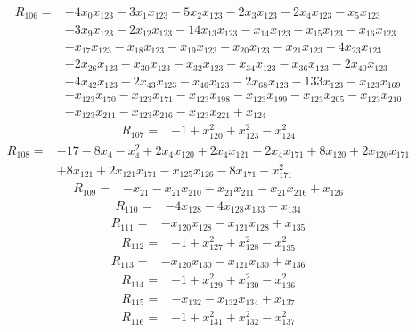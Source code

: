 \[\begin{aligned}R_{106}={}&-4x_{0}x_{123}-3x_{1}x_{123}-5x_{2}x_{123}-2x_{3}x_{123}-2x_{4}x_{123}-x_{5}x_{123}
\\&-3x_{9}x_{123}-2x_{12}x_{123}-14x_{13}x_{123}-x_{14}x_{123}-x_{15}x_{123}-x_{16}x_{123}
\\&-x_{17}x_{123}-x_{18}x_{123}-x_{19}x_{123}-x_{20}x_{123}-x_{21}x_{123}-4x_{23}x_{123}
\\&-2x_{26}x_{123}-x_{30}x_{123}-x_{32}x_{123}-x_{34}x_{123}-x_{36}x_{123}-2x_{40}x_{123}
\\&-4x_{42}x_{123}-2x_{43}x_{123}-x_{46}x_{123}-2x_{68}x_{123}-133x_{123}-x_{123}x_{169}
\\&-x_{123}x_{170}-x_{123}x_{171}-x_{123}x_{198}-x_{123}x_{199}-x_{123}x_{205}-x_{123}x_{210}
\\&-x_{123}x_{211}-x_{123}x_{216}-x_{123}x_{221}+x_{124}
\end{aligned}\]
\[\begin{aligned}R_{107}={}&-1+x_{120}^{2}+x_{123}^{2}-x_{124}^{2}
\end{aligned}\]
\[\begin{aligned}R_{108}={}&-17-8x_{4}-x_{4}^{2}+2x_{4}x_{120}+2x_{4}x_{121}-2x_{4}x_{171}+8x_{120}+2x_{120}x_{171}
\\&+8x_{121}+2x_{121}x_{171}-x_{125}x_{126}-8x_{171}-x_{171}^{2}
\end{aligned}\]
\[\begin{aligned}R_{109}={}&-x_{21}-x_{21}x_{210}-x_{21}x_{211}-x_{21}x_{216}+x_{126}
\end{aligned}\]
\[\begin{aligned}R_{110}={}&-4x_{128}-4x_{128}x_{133}+x_{134}
\end{aligned}\]
\[\begin{aligned}R_{111}={}&-x_{120}x_{128}-x_{121}x_{128}+x_{135}
\end{aligned}\]
\[\begin{aligned}R_{112}={}&-1+x_{127}^{2}+x_{128}^{2}-x_{135}^{2}
\end{aligned}\]
\[\begin{aligned}R_{113}={}&-x_{120}x_{130}-x_{121}x_{130}+x_{136}
\end{aligned}\]
\[\begin{aligned}R_{114}={}&-1+x_{129}^{2}+x_{130}^{2}-x_{136}^{2}
\end{aligned}\]
\[\begin{aligned}R_{115}={}&-x_{132}-x_{132}x_{134}+x_{137}
\end{aligned}\]
\[\begin{aligned}R_{116}={}&-1+x_{131}^{2}+x_{132}^{2}-x_{137}^{2}
\end{aligned}\]
